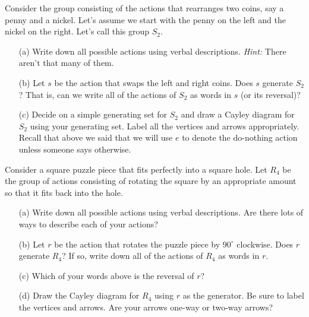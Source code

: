 \begin{exercise}\label{exer:introducing_S2}
Consider the group consisting of the actions that rearranges two coins, say a penny and a nickel.  Let's assume we start with the penny on the left and the nickel on the right.  Let's call this group \(S_2\).

\begin{enumerate}
\item[(a)] Write down all possible actions using verbal descriptions.  \emph{Hint:} There aren't that many of them.
\item[(b)] Let \(s\) be the action that swaps the left and right coins.  Does \(s\) generate \(S_2\)?  That is, can we write all of the actions of \(S_2\) as words in \(s\) (or its reversal)?
\item[(c)] Decide on a simple generating set for \(S_2\) and draw a Cayley diagram for \(S_2\) using your generating set.  Label all the vertices and arrows appropriately.  Recall that above we said that we will use \(e\) to denote the do-nothing action unless someone says otherwise.
\end{enumerate}
\end{exercise}

\begin{exercise}\label{exer:introducing_R4}
Consider a square puzzle piece that fits perfectly into a square hole.  Let \(R_4\) be the group of actions consisting of rotating the square by an appropriate amount so that it fits back into the hole.
\begin{enumerate}
\item[(a)] Write down all possible actions using verbal descriptions.  Are there lots of ways to describe each of your actions?
\item[(b)] Let \(r\) be the action that rotates the puzzle piece by \(90^\circ\) clockwise.  Does \(r\) generate \(R_4\)?  If so, write down all of the actions of \(R_4\) as words in \(r\).
\item[(c)] Which of your words above is the reversal of \(r\)?
\item[(d)] Draw the Cayley diagram for \(R_4\) using \(r\) as the generator.  Be sure to label the vertices and arrows.  Are your arrows one-way or two-way arrows?
\end{enumerate}
\end{exercise}

